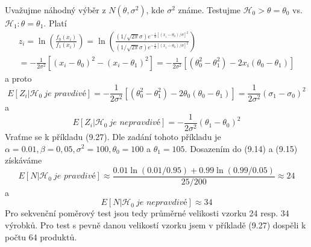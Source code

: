 \begin{example}
Uvažujme náhodný výběr z $N(\theta, \sigma^2)$, kde $\sigma^2$ známe. Testujme $\mathscr{H}_0> \theta = \theta_0$ vs. $\mathscr{H}_1: \theta = \theta_1$. Platí
\begin{multline*}
z_i = \ln \left(\frac{f_0(x_i)}{f_1(x_i)}\right) = \ln \left(\frac{(1 / \sqrt{2 \pi} \sigma)e^{-\frac{1}{2}[(x_i - \theta_0)/\sigma]^2}}{(1 / \sqrt{2 \pi} \sigma)e^{-\frac{1}{2}[(x_i - \theta_0)/\sigma]^2}}\right)\\
= - \frac{1}{2 \sigma^2}[(x_i - \theta_0)^2 - (x_i - \theta_1)^2] = -\frac{1}{2 \sigma^2}[(\theta_0^2 - \theta_1^2) - 2x_i(\theta_0 - \theta_1)]
\end{multline*}
a proto
\begin{equation*}
E[Z_i | \mathscr{H}_0 ~ \textit{je pravdivé}] = -\frac{1}{2 \sigma^2}[(\theta_0^2 - \theta_1^2) - 2 \theta_0(\theta_0 - \theta_1)] = \frac{1}{2 \sigma^2}(\sigma_1 - \sigma_0)^2
\end{equation*}
a
\begin{equation*}
E[Z_i | \mathscr{H}_0 ~ \textit{je nepravdivé}] = - \frac{1}{2 \sigma^2}(\theta_1 - \theta_0)^2
\end{equation*}
Vraťme se k příkladu (9.27). Dle zadání tohoto příkladu je $\alpha = 0.01, \beta = 0,05, \sigma^2 = 100, \theta_0 = 100$ a $\theta_1 = 105$. Dosazením do (9.14) a (9.15) získáváme
\begin{equation*}
E[N|\mathscr{H}_0 ~ \textit{je pravdivé}] \approx \frac{0.01 \ln(0.01 / 0.95) + 0.99 \ln(0.99 / 0.05)}{25 / 200} \approx 24
\end{equation*}
a
\begin{equation*}
E[N | \mathscr{H}_0 ~ \textit{je nepravdivé}] \approx 34
\end{equation*}
Pro sekvenční poměrový test jsou tedy průměrné velikosti vzorku 24 resp. 34 výrobků. Pro test s pevně danou velikostí vzorku jsem v příkladě (9.27) dospěli k počtu 64 produktů. 
\end{example}

